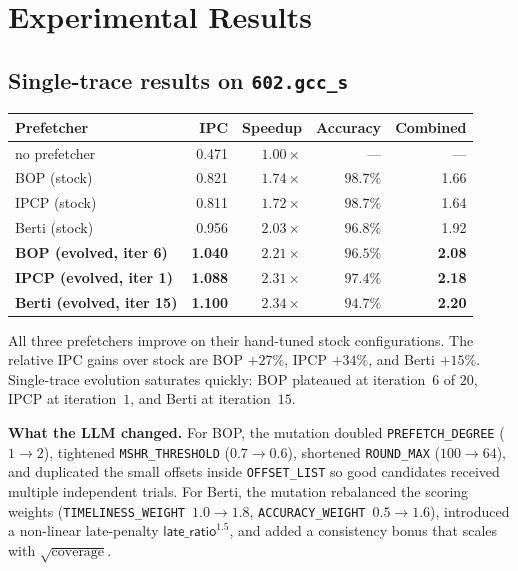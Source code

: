 \documentclass[11pt]{article}
\begin{document}
\section{Experimental Results}

\subsection{Single-trace results on \texttt{602.gcc\_s}}

\begin{center}\small
\begin{tabular}{l r r r r}
\toprule
Prefetcher & IPC & Speedup & Accuracy & Combined \\
\midrule
no prefetcher                & 0.471 & $1.00\times$ & ---     & ---  \\
BOP   (stock)                & 0.821 & $1.74\times$ & $98.7\%$ & 1.66 \\
IPCP  (stock)                & 0.811 & $1.72\times$ & $98.7\%$ & 1.64 \\
Berti (stock)                & 0.956 & $2.03\times$ & $96.8\%$ & 1.92 \\
\midrule
\textbf{BOP   (evolved, iter 6)}   & \textbf{1.040} & $\mathbf{2.21\times}$ & $96.5\%$ & \textbf{2.08} \\
\textbf{IPCP  (evolved, iter 1)}   & \textbf{1.088} & $\mathbf{2.31\times}$ & $97.4\%$ & \textbf{2.18} \\
\textbf{Berti (evolved, iter 15)}  & \textbf{1.100} & $\mathbf{2.34\times}$ & $94.7\%$ & \textbf{2.20} \\
\bottomrule
\end{tabular}
\end{center}

All three prefetchers improve on their hand-tuned stock configurations.
The relative IPC gains over stock are BOP $+27\%$, IPCP $+34\%$, and
Berti $+15\%$. Single-trace evolution saturates quickly: BOP plateaued at
iteration~$6$ of $20$, IPCP at iteration~$1$, and Berti at
iteration~$15$.

\textbf{What the LLM changed.} For BOP, the mutation doubled
\texttt{PREFETCH\_DEGREE} ($1{\to}2$), tightened
\texttt{MSHR\_THRESHOLD} ($0.7{\to}0.6$), shortened
\texttt{ROUND\_MAX} ($100{\to}64$), and duplicated the small offsets
inside \texttt{OFFSET\_LIST} so good candidates received multiple
independent trials. For Berti, the mutation rebalanced the scoring
weights (\texttt{TIMELINESS\_WEIGHT}~$1.0{\to}1.8$,
\texttt{ACCURACY\_WEIGHT}~$0.5{\to}1.6$), introduced a non-linear
late-penalty $\textsf{late\_ratio}^{1.5}$, and added a consistency
bonus that scales with $\sqrt{\text{coverage}}$.
\end{document}
